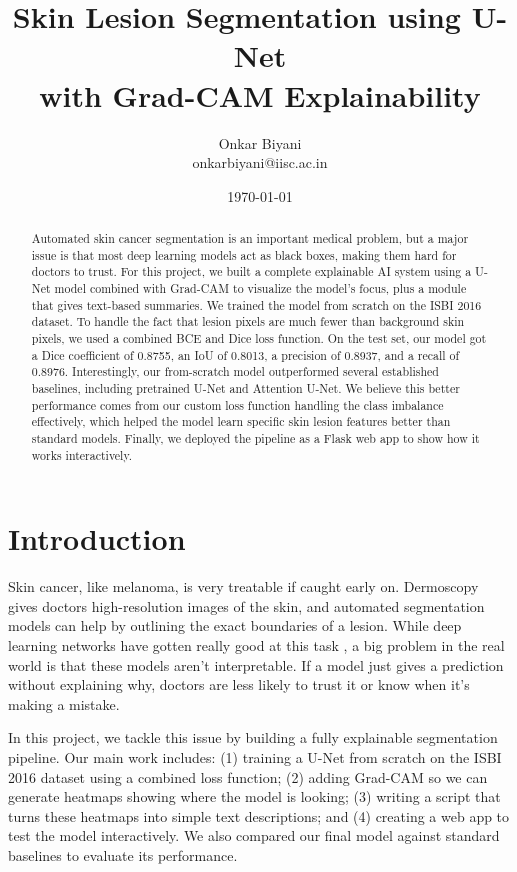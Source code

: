 \documentclass[10pt,journal,compsoc]{IEEEtran}
\title{\textbf{Skin Lesion Segmentation using U-Net\\with Grad-CAM Explainability}}
\author{Onkar Biyani \\
onkarbiyani@iisc.ac.in}
\date{\today}
\begin{document}
\maketitle

\begin{abstract}
Automated skin cancer segmentation is an important medical problem, but a major issue is that most deep learning models act as black boxes, making them hard for doctors to trust. For this project, we built a complete explainable AI system using a U-Net model combined with Grad-CAM to visualize the model's focus, plus a module that gives text-based summaries. We trained the model from scratch on the ISBI 2016 dataset. To handle the fact that lesion pixels are much fewer than background skin pixels, we used a combined BCE and Dice loss function. On the test set, our model got a Dice coefficient of 0.8755, an IoU of 0.8013, a precision of 0.8937, and a recall of 0.8976. Interestingly, our from-scratch model outperformed several established baselines, including pretrained U-Net and Attention U-Net. We believe this better performance comes from our custom loss function handling the class imbalance effectively, which helped the model learn specific skin lesion features better than standard models. Finally, we deployed the pipeline as a Flask web app to show how it works interactively.
\end{abstract}

\section{Introduction}

Skin cancer, like melanoma, is very treatable if caught early on. Dermoscopy gives doctors high-resolution images of the skin, and automated segmentation models can help by outlining the exact boundaries of a lesion. While deep learning networks have gotten really good at this task \cite{unet,skinlesion_survey}, a big problem in the real world is that these models aren't interpretable. If a model just gives a prediction without explaining why, doctors are less likely to trust it or know when it's making a mistake.

In this project, we tackle this issue by building a fully explainable segmentation pipeline. Our main work includes: (1) training a U-Net from scratch on the ISBI 2016 dataset using a combined loss function; (2) adding Grad-CAM so we can generate heatmaps showing where the model is looking; (3) writing a script that turns these heatmaps into simple text descriptions; and (4) creating a web app to test the model interactively. We also compared our final model against standard baselines to evaluate its performance.
\end{document}
